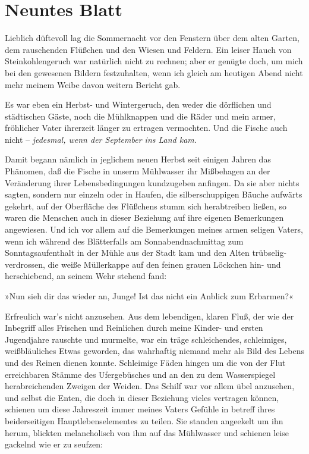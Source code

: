 \section{Neuntes Blatt}

Lieblich düftevoll lag die Sommernacht vor den Fenstern über dem
alten Garten, dem rauschenden Flüßchen und den Wiesen und Feldern.
Ein leiser Hauch von Steinkohlengeruch war natürlich nicht zu
rechnen; aber er genügte doch, um mich bei den gewesenen Bildern
festzuhalten, wenn ich gleich am heutigen Abend nicht mehr meinem
Weibe davon weitern Bericht gab.

Es war eben ein Herbst- und Wintergeruch, den weder die dörflichen
und städtischen Gäste, noch die Mühlknappen und die Räder und mein
armer, fröhlicher Vater ihrerzeit länger zu ertragen vermochten.
Und die Fische auch nicht –
\emph{jedesmal, wenn der September ins Land kam}.

Damit begann nämlich in jeglichem neuen Herbst seit einigen Jahren
das Phänomen, daß die Fische in unserm Mühlwasser ihr Mißbehagen an
der Veränderung ihrer Lebensbedingungen kundzugeben anfingen. Da
sie aber nichts sagten, sondern nur einzeln oder in Haufen, die
silberschuppigen Bäuche aufwärts gekehrt, auf der Oberfläche des
Flüßchens stumm sich herabtreiben ließen, so waren die Menschen
auch in dieser Beziehung auf ihre eigenen Bemerkungen angewiesen.
Und ich vor allem auf die Bemerkungen meines armen seligen Vaters,
wenn ich während des Blätterfalls am Sonnabendnachmittag zum
Sonntagsaufenthalt in der Mühle aus der Stadt kam und den Alten
trübselig-verdrossen, die weiße Müllerkappe auf den feinen grauen
Löckchen hin- und herschiebend, an seinem Wehr stehend fand:

»Nun sieh dir das wieder an, Junge! Ist das nicht ein Anblick zum
Erbarmen?«

Erfreulich war's nicht anzusehen. Aus dem lebendigen, klaren Fluß,
der wie der Inbegriff alles Frischen und Reinlichen durch meine
Kinder- und ersten Jugendjahre rauschte und murmelte, war ein träge
schleichendes, schleimiges, weißbläuliches Etwas geworden, das
wahrhaftig niemand mehr als Bild des Lebens und des Reinen dienen
konnte. Schleimige Fäden hingen um die von der Flut erreichbaren
Stämme des Ufergebüsches und an den zu dem Wasserspiegel
herabreichenden Zweigen der Weiden. Das Schilf war vor allem übel
anzusehen, und selbst die Enten, die doch in dieser Beziehung
vieles vertragen können, schienen um diese Jahreszeit immer meines
Vaters Gefühle in betreff ihres beiderseitigen Hauptlebenselementes
zu teilen. Sie standen angeekelt um ihn herum, blickten
melancholisch von ihm auf das Mühlwasser und schienen leise
gackelnd wie er zu seufzen:

